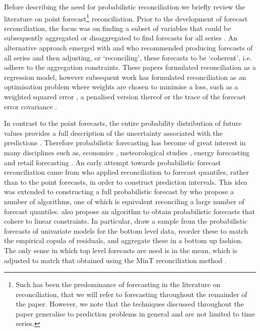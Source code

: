 \documentclass[12pt]{article}
\theoremstyle{definition}
\begin{document}
Before describing the need for probabilistic reconciliation we briefly review the literature on point forecast\footnote{Such has been the predominance of forecasting in the literature on reconciliation, that we will refer to forecasting throughout the remainder of the paper.  However, we note that the techniques discussed throughout the paper generalise to prediction problems in general and are not limited to time series.} reconciliation.  Prior to the development of forecast reconciliation, the focus was on finding a subset of variables that could be subsequently aggregated or disaggregated to find forecasts for all series \citep[see][and references therin]{Dunn1976,Gross1990}.  An alternative approach emerged with \cite{AthEtAl2009} and \cite{HynEtAl2011} who recommended producing forecasts of all series and then adjusting, or `reconciling', these forecasts to be `coherent', i.e. adhere to the aggregation constraints. These papers formulated reconciliation as a regression model, however subsequent work has formulated reconciliation as an optimisation problem where weights are chosen to minimise a loss, such as a weighted squared error \citep{VanErven2015a,nystrup2020}, a penalised version thereof \citep{bentaiebkoo} or the trace of the forecast error covariance \citep{WicEtAl2019}. 

In contrast to the point forecasts, the entire probability distribution of future values provides a full description of the uncertainty associated with the predictions \citep{Abramson1995, Gneiting2014}. Therefore probabilistic forecasting has become of great interest in many disciplines such as, economics \citep{zarnowitz1987, rossi2014}, meteorological studies \citep{pinson2009, mclean2013}, energy forecasting \citep{wytock2013, BenTaieb2017} and retail forecasting \citep{bose2017}. An early attempt towards probabilistic forecast reconciliation came from \cite{ShaHyn2017} who applied reconciliation to forecast quantiles, rather than to the point forecasts, in order to construct prediction intervals.  This idea was extended to constructing a full probabilistic forecast by \citet{JeoEtAl2019} who propose a number of algorithms, one of which is equivalent reconciling a large number of forecast quantiles.  \citet{Taieb2017} also propose an algorithm to obtain probabilistic forecasts that cohere to linear constraints. In particular, \citet{Taieb2017} draw a sample from the probabilistic forecasts of univariate models for the bottom level data, reorder these to match the empirical copula of residuals, and aggregate these in a bottom up fashion.  The only sense in which top level forecasts are used is in the mean, which is adjusted to match that obtained using the MinT reconciliation method \citep{WicEtAl2019}.
\end{document}
